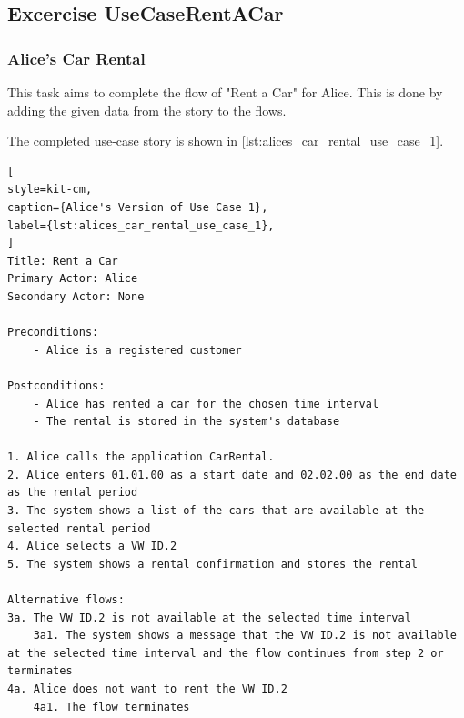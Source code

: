 \subsection{Excercise UseCaseRentACar}
\label{sec:exercise_use_case_rent_a_car}
\subsubsection*{Alice's Car Rental}
This task aims to complete the flow of "Rent a Car" for Alice.
This is done by adding the given data from the story to the flows.

The completed use-case story is shown in \autoref{lst:alices_car_rental_use_case_1}.

\begin{lstlisting}[
style=kit-cm,
caption={Alice's Version of Use Case 1},
label={lst:alices_car_rental_use_case_1},
]
Title: Rent a Car
Primary Actor: Alice
Secondary Actor: None

Preconditions:
    - Alice is a registered customer

Postconditions:
    - Alice has rented a car for the chosen time interval
    - The rental is stored in the system's database

1. Alice calls the application CarRental.
2. Alice enters 01.01.00 as a start date and 02.02.00 as the end date as the rental period
3. The system shows a list of the cars that are available at the selected rental period
4. Alice selects a VW ID.2
5. The system shows a rental confirmation and stores the rental

Alternative flows:
3a. The VW ID.2 is not available at the selected time interval
    3a1. The system shows a message that the VW ID.2 is not available at the selected time interval and the flow continues from step 2 or terminates
4a. Alice does not want to rent the VW ID.2
    4a1. The flow terminates
\end{lstlisting}
